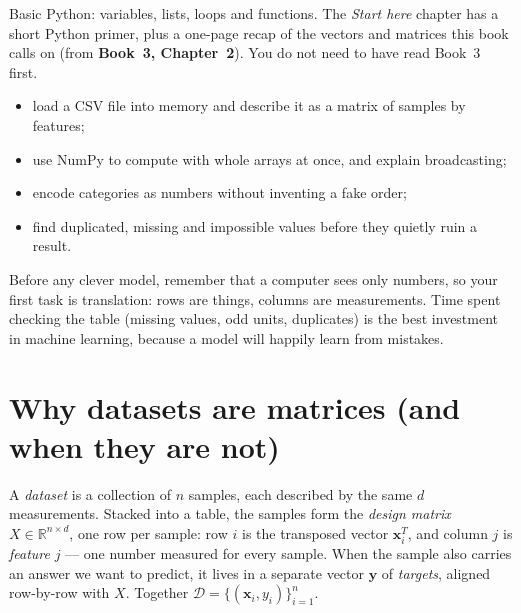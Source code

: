 \begin{rulebox}
Basic Python: variables, lists, loops and functions. The \emph{Start here} chapter has a short Python primer, plus a one-page recap of the vectors and matrices this book calls on (from \textbf{Book~3, Chapter~2}). You do not need to have read Book~3 first.
\end{rulebox}
\begin{wins}
\begin{itemize}
\item load a CSV file into memory and describe it as a matrix of samples by features;
\item use NumPy to compute with whole arrays at once, and explain broadcasting;
\item encode categories as numbers without inventing a fake order;
\item find duplicated, missing and impossible values before they quietly ruin a result.
\end{itemize}
\end{wins}
\begin{principle}
Before any clever model, remember that a computer sees only numbers, so your first task is translation: rows are things, columns are measurements. Time spent checking the table (missing values, odd units, duplicates) is the best investment in machine learning, because a model will happily learn from mistakes.
\end{principle}

\section{Why datasets are matrices (and when they are not)}\label{sec:matrices}

A \emph{dataset} is a collection of $n$ samples, each described
by the same $d$ measurements. Stacked into a table, the samples form the
\emph{design matrix} $X\in\mathbb R^{n\times d}$, one row
per sample: row $i$ is the transposed vector $\mathbf x_i^T$, and column $j$ is
\emph{feature} $j$ --- one number measured for every sample.
When the sample also carries an answer we want to predict, it lives in a
separate vector $\mathbf y$ of \emph{targets}, aligned row-by-row
with $X$. Together $\mathcal D=\{(\mathbf x_i,y_i)\}_{i=1}^{n}$.

